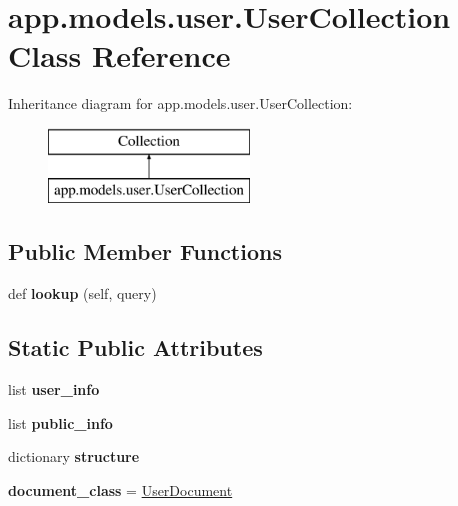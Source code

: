 \hypertarget{classapp_1_1models_1_1user_1_1_user_collection}{}\section{app.\+models.\+user.\+User\+Collection Class Reference}
\label{classapp_1_1models_1_1user_1_1_user_collection}
Inheritance diagram for app.\+models.\+user.\+User\+Collection\+:\begin{figure}[H]
\begin{center}
\leavevmode
\includegraphics[height=2.000000cm]{classapp_1_1models_1_1user_1_1_user_collection}
\end{center}
\end{figure}
\subsection*{Public Member Functions}
\begin{DoxyCompactItemize}
\item 
\mbox{\label{classapp_1_1models_1_1user_1_1_user_collection_ab99eb4a1fa53cb10a543223a89a29aba}} 
def {\bfseries lookup} (self, query)
\end{DoxyCompactItemize}
\subsection*{Static Public Attributes}
\begin{DoxyCompactItemize}
\item 
list {\bfseries user\+\_\+info}
\item 
list {\bfseries public\+\_\+info}
\item 
dictionary {\bfseries structure}
\item 
\mbox{\label{classapp_1_1models_1_1user_1_1_user_collection_a556792b172fb7dae35e0728a998b082d}} 
{\bfseries document\+\_\+class} = \hyperlink{classapp_1_1models_1_1user_1_1_user_document}{User\+Document}
\end{DoxyCompactItemize}


